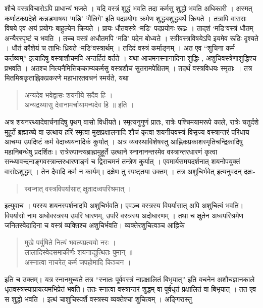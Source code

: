 शौचे वस्त्रविचारोऽपि प्राधान्यं भजते । यदि वस्त्रं शुद्धं भवति तदा कर्मसु शुद्धो भवति अधिकारी । अस्मत् कर्णाटकप्रदेशे कन्नडभाषया ‘मडि’ ‘मैलिगे’ इति पदप्रयोगः क्रमेण शुद्ध्यशुद्ध्यर्थे क्रियते । तत्रापि वाससः विषये एव अयं प्रयोगः बाहुल्येन क्रियते । प्रायः धौतवस्त्रे ‘मडि’ पदप्रयोगः रूढः । ताद्शं ‘मडि’वस्त्रं धौतम् अन्यैरस्पृष्टं च भवति । तच्च वस्त्रं अधौतमपि ‘मडि’ पदेन बोध्यते । स्त्रीवस्त्रविषयेऽपि इयमेव रूढिः दृश्यते । धौतं कौशेयं च ताभिः ध्रियते ‘मडि’वस्त्रार्थम् । तदिदं वस्त्रं कर्माङ्गम् । अत एव “शुचिना कर्म कर्तव्यम्” इत्यादिषु वस्त्राशौचमपि अन्तर्हितं वर्तते । यथा आचमनस्नानादिना शुद्धिः , अशुचिवस्त्रेणाशुद्धिश्च प्रभवति । अतश्च नित्यनैमित्तिककाम्यकर्मसु वस्त्रशौचं सुतरामपेक्षितम् । तदर्थं वस्त्रविधयः स्मृताः । तत्र मितमिश्रकृताह्निकप्रकरणे महाभारतवचनं स्मर्यते, यथा
\begin{verse}
अन्यदेव भवेद्वासः शयनीये सदैव हि ।\\
अन्यद्रथ्यासु देवानामर्चायामन्यदेव हि ॥ इति ।
\end{verse}
अत्र शयनरथ्यादेवार्चनादिषु  पृथग् वासो विधीयते। स्मृत्यनुगुणं प्रातः, रात्रेः पश्चिमयामरूपे काले, रात्रेः चतुर्दशे मुहूर्ते ब्रह्माख्ये वा उत्थाय हरिं स्मृत्वा मुखप्रक्षालनादि शौचं कृत्वा शयनीयवस्त्रं विसृज्य वस्त्रान्तरं परिधाय आचम्य उपदिष्टं कर्म वेदाध्ययनादिकं कुर्यात् । अत्र व्यवस्थाविशेषस्तु आह्निकप्रकाशस्मृतिचन्द्रिकादिषु महानिबन्धेषु प्रदर्शितः। रात्रेरुपान्त्यब्राह्ममुहूर्ते उत्थाने स्नानानन्तरमेव वस्त्रान्तरधारणं कृत्वा सन्ध्यावन्दनाङ्गवस्त्रान्तरधारणाङ्गं च द्विराचमनं तन्त्रेण कुर्यात् । एवमार्यसमयदर्शनात् शयनोपयुक्तं वासोऽशुद्धम् । तेन दैवादि कर्म न कार्यम्। दक्षेण तु स्पष्ट्तया उक्तम् । तत्र अशुचिर्भवेत् इत्यनुवदन् दक्षः- 
\begin{verse}
स्वप्नात् वस्त्रविपर्यासात् क्षुतादध्वपरिश्रमात् । 
\end{verse}
इत्युवाच । परस्य शयनस्पर्शनादपि अशुचिर्भवति। एवञ्च वस्त्रस्य विपर्यासात् अपि अशुचित्वं भवति। विपर्यासो नाम अधोवस्त्रस्य उपरि धारणम्, उपरि वस्त्रस्य अदोधारणम् । तथा च क्षुतेन अध्वपरिश्रमेण जनितस्वेदादिना च वस्त्रं व्यक्तिश्च अशुचिर्भवति। व्यक्तेरशुचित्वञ्च आह्निके 
\begin{verse}
मुखे पर्युषिते नित्यं भवत्यप्रत्ययो नरः । \\
लालादिस्वेदसमाकीर्णः शयनाद्युत्थितः पुमान् ॥\\
अस्नात्वा नाचरेत् कर्म जपहोमादि किञ्चन ।
\end{verse}
इति च उक्तम्। यत्र स्नानमुच्यते तत्र “स्नातः पूर्ववस्त्रं नाप्रक्षालितं बिभृयात्” इति वचनेन अशौचज्ञानकाले धृतवस्त्रस्याप्रायत्यमभिप्रेतं भवति। ततः स्नात्वा वस्त्रान्तरं शुद्धम् वा पूर्वधृतं प्रक्षालितं वा बिभृयात् । तत एव स शुद्धो भवति । इत्थं चाशुचिस्पर्शे वस्त्रस्य व्यक्तेश्चा शुचित्वम् । अङ्गिरास्तु 
